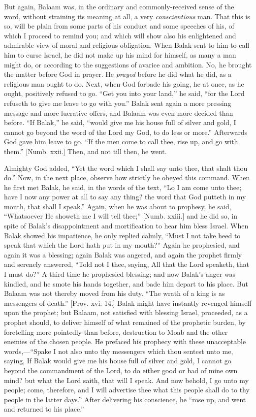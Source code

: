 But again, Balaam was, in the ordinary and commonly-received sense
of the word, without straining its meaning at all, a very \emph{conscientious}
man. That this is so, will be plain from some parts of his conduct and
some speeches of his, of which I proceed to remind you; and which will
show also his enlightened and admirable view of moral and religious
obligation. When Balak sent to him to call him to curse Israel, he did
not make up his mind for himself, as many a man might do, or according
to the suggestions of avarice and ambition. No, he brought the matter
before God in prayer. He \emph{prayed} before he did what he did, as a
religious man ought to do. Next, when God forbade his going, he at
once, as he ought, positively refused to go. ``Get you into your
land,'' he said, ``for the Lord refuseth to give me leave to
go with you.'' Balak sent again a more pressing message and more
lucrative offers, and Balaam was even more decided than before.
``If Balak,'' he said, ``would give me his house full of
silver and gold, I cannot go beyond the word of the Lord my God, to do
less or more.'' Afterwards God gave him leave to go. ``If the
men come to call thee, rise up, and go with them.'' [Numb. xxii.]
Then, and not till then, he went.

Almighty God added, ``Yet the word which I shall say unto thee,
that shalt thou do.'' Now, in the next place, observe how strictly
he obeyed this command. When he first met Balak, he said, in the words
of the text, ``Lo I am come unto thee; have I now any power at all
to say any thing? the word that God putteth in my mouth, that shall I
speak.'' Again, when he was about to prophesy, he said,
``Whatsoever He showeth me I will tell thee;'' [Numb. xxiii.]
and he did so, in spite of Balak's disappointment and mortification to
hear him bless Israel. When Balak showed his impatience, he only
replied calmly, ``Must I not take heed to speak that which the
Lord hath put in my mouth?'' Again he prophesied, and again it was
a blessing; again Balak was angered, and again the prophet firmly and
serenely answered, ``Told not I thee, saying, All that the Lord
speaketh, that I must do?'' A third time he prophesied blessing;
and now Balak's anger was kindled, and he smote his hands together,
and bade him depart to his place. But Balaam was not thereby moved
from his duty. ``The wrath of a king is as messengers of
death.'' [Prov. xvi. 14.] Balak might have instantly revenged
himself upon the prophet; but Balaam, not satisfied with blessing
Israel, proceeded, as a prophet should, to deliver himself of what
remained of the prophetic burden, by foretelling more pointedly than
before, destruction to Moab and the other enemies of the chosen
people. He prefaced his prophecy with these unacceptable words,—``Spake
I not also unto thy messengers which thou sentest unto me, saying, If
Balak would give me his house full of silver and gold, I cannot go
beyond the commandment of the Lord, to do either good or bad of mine
own mind? but what the Lord saith, that will I speak. And now behold,
I go unto my people; come, therefore, and I will advertise thee what
this people shall do to thy people in the latter days.'' After
delivering his conscience, he ``rose up, and went and returned to
his place.''


